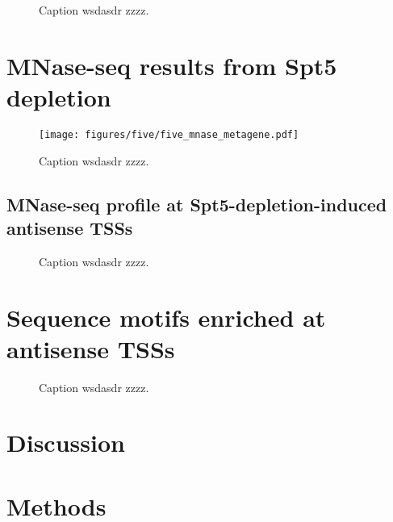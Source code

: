 \lipsum[1]

\begin{figure}
\caption[Heatmaps of antisense TSS-seq, RNA-seq, and NET-seq signal from Spt5 depleted and non-depleted cells, over genes with Spt5-depletion-induced antisense TSSs.]{Caption wsdasdr zzzz.}
\end{figure}

\section{MNase-seq results from Spt5 depletion}

\begin{wrapfigure}[10]{r}{3in}
    \texttt{[image: figures/five/five\_mnase\_metagene.pdf]}
    \caption[Average MNase-seq dyad signal from Spt5 depleted and non-depleted cells, over non-overlapping coding genes.]{Caption wsdasdr zzzz.}
    \label{fig:five_mnase_metagene}
\end{wrapfigure}

\lipsum[1]

\subsection{MNase-seq profile at Spt5-depletion-induced antisense TSSs}

\begin{figure}
\caption[A figure showing MNase-seq signal around Spt5-depletion-induced antisense TSSs.]{Caption wsdasdr zzzz.}
\end{figure}

\section{Sequence motifs enriched at antisense TSSs}

\begin{figure}
\caption[A figure showing motifs enriched upstream of Spt5-depletion-induced antisense TSSs.]{Caption wsdasdr zzzz.}
\end{figure}

\section{Discussion}

\section{Methods}

\newpage

\begingroup
    \singlespacing
    
\endgroup
